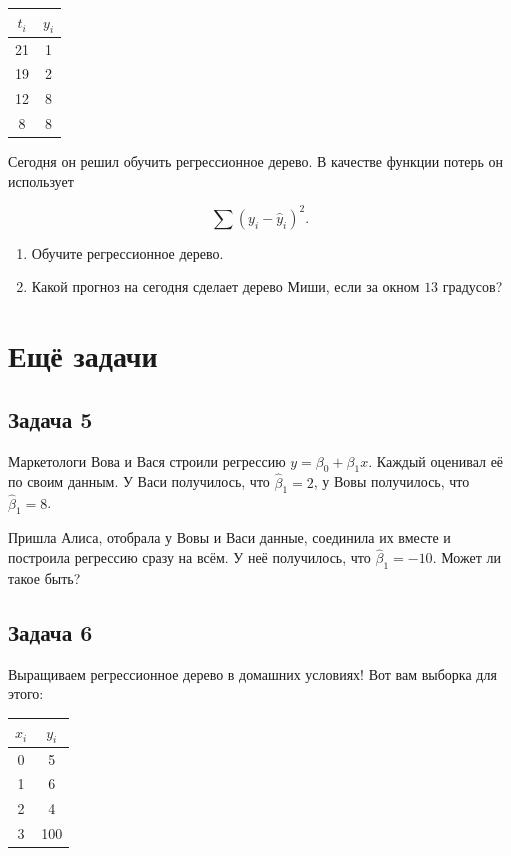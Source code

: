 \documentclass[12pt, a4paper, oneside]{article}
\begin{document}
\begin{center}
	\begin{tabular}{c|c}
		\hline
		$t_i$ & $y_i$ \\
		\hline
		21 &  1 \\
		19 & 2 \\
		12 & 8 \\
	     8 & 8 \\
	\end{tabular}
\end{center}

Сегодня он решил обучить регрессионное дерево. В качестве функции потерь он использует 

\[ \sum (y_i - \hat y_i)^2. \]

\begin{enumerate}
	\item Обучите регрессионное дерево.
	\item Какой прогноз на сегодня сделает дерево Миши, если за окном $13$ градусов? 
\end{enumerate}


\section*{Ещё задачи}

\subsection*{Задача 5}

Маркетологи Вова и Вася строили регрессию $y = \beta_0 + \beta_1 x$. Каждый оценивал её по своим данным. У Васи получилось, что $\hat \beta_1 = 2$, у Вовы получилось, что $\hat \beta_1 = 8$.

Пришла Алиса, отобрала у Вовы и Васи данные, соединила их вместе и построила регрессию сразу на всём. У неё получилось, что $\hat \beta_1 = -10$. Может ли такое быть?

\subsection*{Задача 6}

Выращиваем регрессионное дерево в домашних условиях! Вот вам выборка для этого: 

\begin{center}
	\begin{tabular}{c|c}
		\hline
		$x_i$ & $y_i$ \\
		\hline
		0 & 5 \\
		1 &  6\\
		2 & 4 \\
		3 & 100 \\
	\end{tabular}
\end{center}
\end{document}
